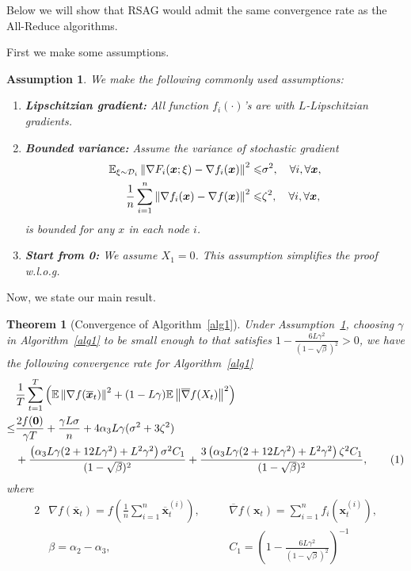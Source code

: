 \documentclass{article}
\newcommand\numberthis{\addtocounter{equation}{1}\tag{\theequation}}
\newcounter{ass_counter}
\newcounter{thm_counter}
\newtheorem{theorem}[thm_counter]{Theorem}%
\newtheorem{assumption}[ass_counter]{Assumption}
\begin{document}

Below we will show that RSAG would admit the same convergence rate as the All-Reduce algorithms.

First we make some assumptions.
\begin{assumption}
\label{ass:global}
We make the following commonly used assumptions:
\begin{enumerate}
  \item \textbf{Lipschitzian gradient:} All function $f_i(\cdot)$'s are with $L$-Lipschitzian gradients.
 \item \textbf{Bounded variance:} Assume the variance of stochastic gradient
\begin{align*}
    \mathbb{E}_{\xi\sim \mathcal{D}_i} \left\| \nabla F_i (\bm{x}; \xi) - \nabla f_i (\bm{x})\right\|^2 \leqslant & \sigma^2, \quad \forall i, \forall \bm{x},\\
     {1\over n}\sum_{i=1}^n\left\| \nabla f_i (\bm{x})-\nabla f (\bm{x})\right\|^2 \leqslant & \zeta^2, \quad \forall i, \forall \bm{x},
\end{align*}
  is bounded for any $x$ in each node $i$.
  \item \textbf{Start from 0:} We assume $X_1 = 0$. This assumption simplifies the proof w.l.o.g.
  \end{enumerate}
\end{assumption}

Now, we state our main result.
\begin{theorem}[Convergence of Algorithm~\ref{alg1}] \label{theo:1}
Under Assumption~\ref{ass:global}, choosing $\gamma$ in Algorithm~\ref{alg1} to be small enough to that satisfies $1- \frac{6L\gamma^2}{(1-\sqrt{\beta})^2}>0$, we have the following convergence rate for Algorithm~\ref{alg1}
\begin{align*}
&\frac{1}{T}\sum_{t=1}^T\left( \mathbb{E}\left\|\nabla f(\overline{\bm{x}}_{t})\right\|^2 + (1-L\gamma)\mathbb{E}\left\|\overline{\nabla} f(X_t)\right\|^2 \right)\\
\leq & \frac{2f(\bm{0})}{\gamma T}  + \frac{\gamma L\sigma }{n} + 4\alpha_3 L\gamma(\sigma^2 + 3\zeta^2)\\
& + \frac{\left(\alpha_3 L\gamma(2+ 12L\gamma^2) + L^2\gamma^2\right)\sigma^2 C_1}{(1-\sqrt{\beta})^2} + \frac{3\left(\alpha_3 L\gamma(2+ 12L\gamma^2) + L^2\gamma^2\right)\zeta^2 C_1}{(1-\sqrt{\beta})^2},\numberthis\label{theo1eq}
\end{align*}
where
\begin{alignat*}{2}
&\nabla f(\overline{\bm{x}}_t) = f\left(\frac{1}{n}\sum_{i=1}^n\overline{\bm{x}}_t^{(i)}\right) , &\quad & \overline{\nabla} f(\bm{x}_t) = \sum_{i=1}^nf_i\left(\bm{x}_t^{(i)}\right),\\
 &\beta = \alpha_2 - \alpha_3, &\quad &
C_1 = \left(1- \frac{6L\gamma^2}{(1-\sqrt{\beta})^2} \right)^{-1}
\end{alignat*}
\end{theorem}
\end{document}
